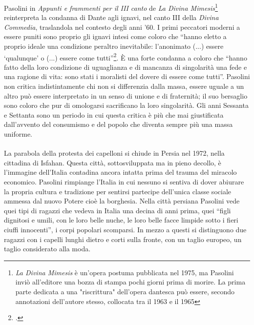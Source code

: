 Pasolini in \textit{Appunti e frammenti per il III canto} de \textit{La Divina Mimesis}\footnote{\textit{La Divina Mimesis} è un'opera postuma pubblicata nel 1975, ma  Pasolini inviò all'editore una bozza di stampa pochi giorni prima di morire. La prima parte dedicata a una "riscrittura" dell'opera dantesca può essere, secondo annotazioni dell'autore stesso, collocata tra il 1963 e il 1965} reinterpreta la condanna di Dante agli ignavi, nel canto III della \textit{Divina Commedia}, traslandola nel contesto degli anni '60.
I primi peccatori moderni a essere puniti sono proprio gli ignavi intesi come coloro che \enquote{hanno eletto a proprio ideale una condizione peraltro inevitabile: l'anonimato (...) essere \enquote{qualunque} o  (...) essere come tutti}\footcite[1094]{Mimesis}.
È una forte condanna a coloro che \enquote{hanno fatto della loro condizione di uguaglianza e di mancanza di singolarità una fede e una ragione di vita: sono stati i moralisti del dovere di essere come tutti}.
Pasolini non critica indistintamente chi non si differenzia dalla massa, essere uguale a un altro può essere interpretato in un senso di unione e di fraternità; il suo bersaglio sono coloro che pur di omologarsi sacrificano la loro singolarità.
Gli anni Sessanta e Settanta sono un periodo in cui questa critica è più che mai giustificata dall'avvento del consumismo e del popolo che diventa sempre più una massa uniforme.

\paragraph{}La parabola della protesta dei capelloni si chiude in Persia nel 1972, nella cittadina di Isfahan.
Questa città, sottosviluppata ma in pieno decollo, è l'immagine dell'Italia contadina ancora intatta prima del trauma del miracolo economico.
Pasolini rimpiange l'Italia in cui nessuno si sentiva di dover abiurare la propria cultura e tradizione per sentirsi partecipe dell'unica classe sociale ammessa dal nuovo Potere cioè la borghesia.
Nella città persiana Pasolini vede quei tipi di ragazzi che vedeva in Italia una decina di anni prima, quei \enquote{figli dignitosi e umili, con le loro belle nuche, le loro belle facce limpide sotto i fieri ciuffi innocenti}, i corpi popolari scomparsi.
In mezzo a questi si distinguono due ragazzi con i capelli lunghi dietro e corti sulla fronte, con un taglio europeo, un taglio considerato alla moda.

